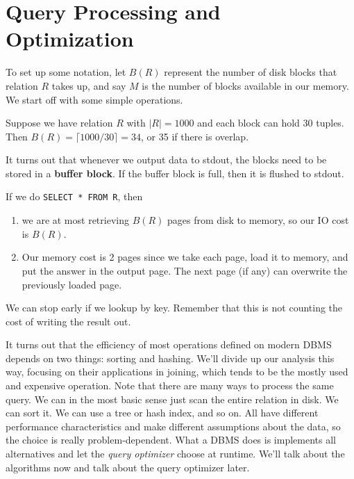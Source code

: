 \section{Query Processing and Optimization}

  \begin{definition}
    To set up some notation, let $B(R)$ represent the number of disk blocks that relation $R$ takes up, and say $M$ is the number of blocks available in our memory. We start off with some simple operations. 
  \end{definition}

  \begin{example}
    Suppose we have relation $R$ with $|R| = 1000$ and each block can hold 30 tuples. Then $B(R) = \lceil 1000 / 30 \rceil = 34$, or 35 if there is overlap. 
  \end{example}

  \begin{definition}
    It turns out that whenever we output data to stdout, the blocks need to be stored in a \textbf{buffer block}. If the buffer block is full, then it is flushed to stdout. 
  \end{definition}

  \begin{example}
    If we do \texttt{SELECT * FROM R}, then 
    \begin{enumerate}
      \item we are at most retrieving $B(R)$ pages from disk to memory, so our IO cost is $B(R)$. 
      \item Our memory cost is 2 pages since we take each page, load it to memory, and put the answer in the output page. The next page (if any) can overwrite the previously loaded page. 
    \end{enumerate}
    We can stop early if we lookup by key. Remember that this is not counting the cost of writing the result out. 
  \end{example}

  It turns out that the efficiency of most operations defined on modern DBMS depends on two things: sorting and hashing. We'll divide up our analysis this way, focusing on their applications in joining, which tends to be the mostly used and expensive operation. Note that there are many ways to process the same query. We can in the most basic sense just scan the entire relation in disk. We can sort it. We can use a tree or hash index, and so on. All have different performance characteristics and make different assumptions about the data, so the choice is really problem-dependent. What a DBMS does is implements all alternatives and let the \textit{query optimizer} choose at runtime. We'll talk about the algorithms now and talk about the query optimizer later. 

